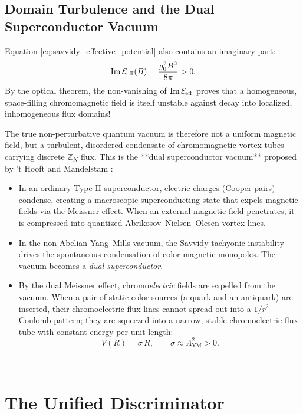 \subsection{Domain Turbulence and the Dual Superconductor Vacuum}
\label{subsec:dual_superconductor_vacuum}

Equation \eqref{eq:savvidy_effective_potential} also contains an imaginary part:
\begin{equation}
\label{eq:ch10_imaginary_decay_rate}
\mathrm{Im} \, \mathcal{E}_{\mathrm{eff}}(B) = \frac{g_0^2 B^2}{8\pi} > 0.
\end{equation}
By the optical theorem, the non-vanishing of $\mathrm{Im} \, \mathcal{E}_{\mathrm{eff}}$ proves that a homogeneous, space-filling chromomagnetic field is itself unstable against decay into localized, inhomogeneous flux domains!

The true non-perturbative quantum vacuum is therefore not a uniform magnetic field, but a turbulent, disordered condensate of chromomagnetic vortex tubes carrying discrete $\mathbb{Z}_N$ flux. This is the **dual superconductor vacuum** proposed by 't Hooft \cite{tHooft1978} and Mandelstam \cite{Mandelstam1976}:
\begin{itemize}
    \item In an ordinary Type-II superconductor, electric charges (Cooper pairs) condense, creating a macroscopic superconducting state that expels magnetic fields via the Meissner effect. When an external magnetic field penetrates, it is compressed into quantized Abrikosov--Nielsen--Olesen vortex lines.
    \item In the non-Abelian Yang--Mills vacuum, the Savvidy tachyonic instability drives the spontaneous condensation of color magnetic monopoles. The vacuum becomes a \emph{dual superconductor}.
    \item By the dual Meissner effect, chromo\emph{electric} fields are expelled from the vacuum. When a pair of static color sources (a quark and an antiquark) are inserted, their chromoelectric flux lines cannot spread out into a $1/r^2$ Coulomb pattern; they are squeezed into a narrow, stable chromoelectric flux tube with constant energy per unit length:
    \begin{equation}
    V(R) = \sigma \, R, \qquad \sigma \approx \Lambda_{\mathrm{YM}}^2 > 0.
    \end{equation}
\end{itemize}

---

\section{The Unified Discriminator}
\label{sec:unified_discriminator}

